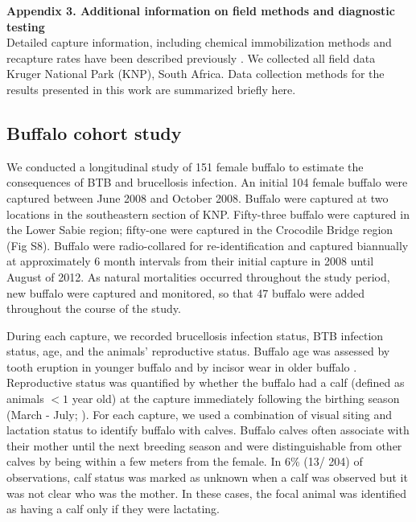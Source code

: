 \documentclass[10pt,letterpaper]{article}
\begin{document}
\noindent \Large{\textbf{Appendix 3. Additional information on field methods and diagnostic testing}}\\
\normalsize
Detailed capture information, including chemical immobilization methods and recapture rates have been described previously \cite{beechler_enemies_2015, gorsich_context-dependent_2015, ezenwa_opposite_2015}. We collected all field data Kruger National Park (KNP), South Africa. Data collection methods for the results presented in this work are summarized briefly here. 

\subsection*{Buffalo cohort study}
 We conducted a longitudinal study of 151 female buffalo to estimate the consequences of BTB and brucellosis infection. An initial 104 female buffalo were captured between June 2008 and October 2008. Buffalo were captured at two locations in the southeastern section of KNP. Fifty-three buffalo were captured in the Lower Sabie region; fifty-one were captured in the Crocodile Bridge region (Fig S8). Buffalo were radio-collared for re-identification and captured biannually at approximately 6 month intervals from their initial capture in 2008 until August of 2012. As natural mortalities occurred throughout the study period, new buffalo were captured and monitored, so that 47 buffalo were added throughout the course of the study.
 
During each capture, we recorded brucellosis infection status, BTB infection status, age, and the animals' reproductive status. Buffalo age was assessed by tooth eruption in younger buffalo and by incisor wear in older buffalo \cite{jolles_population_2007}. Reproductive status was quantified by whether the buffalo had a calf (defined as animals $< 1$ year old) at the capture immediately following the birthing season (March - July; \cite{gorsich_context-dependent_2015}). For each capture, we used a combination of visual siting and lactation status to identify buffalo with calves. Buffalo calves often associate with their mother until the next breeding season and were distinguishable from other calves by being within a few meters from the female. In 6\% (13/ 204) of observations, calf status was marked as unknown when a calf was observed but it was not clear who was the mother. In these cases, the focal animal was identified as having a calf only if they were lactating. \\
\end{document}
